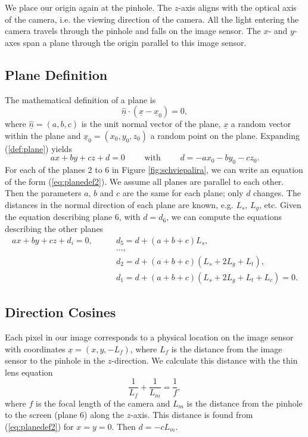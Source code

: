 \documentclass{svjour3}                     %
\begin{document}
We place our origin again at the pinhole. The $z$-axis aligns with the optical axis of the camera, i.e. the viewing direction of the camera. All the light entering the camera travels through the pinhole and falls on the image sensor. The $x$- and $y$-axes span a plane through the origin parallel to this image sensor. 

\subsection{Plane Definition}
The mathematical definition of a plane is
\begin{equation}
	\label{def:plane}
	\underline{\hat{n}} \cdot (\underline{x}-\underline{x}_0) = 0,
\end{equation}
where $\underline{\hat{n}} = (a,b,c)$ is the unit normal vector of the plane, $\underline{x}$ a random vector within the plane and $\underline{x}_0=(x_0, y_0, z_0)$ a random point on the plane. Expanding (\ref{def:plane}) yields
\begin{equation}
	\label{eq:planedef2}
	ax+by+cz + d = 0 \qquad \mbox{ with } \qquad d = - a x_0 - b y_0 - c z_0.
\end{equation}
For each of the planes 2 to 6 in Figure \ref{fig:schviepalira}, we can write an equation of the form (\ref{eq:planedef2}). We assume all planes are parallel to each other. Then the parameters $a$, $b$ and $c$ are the same for each plane; only $d$ changes. The distances in the normal direction of each plane are known, e.g. $L_s$, $L_g$, etc. Given the equation describing plane 6, with $d=d_6$,
we can compute the equations describing the other planes
\begin{align}
a x + b y + c z + d_i = 0, \qquad  
& d_5 = d + (a+b+c) L_s, \nonumber \\
& ..., \nonumber \\ 
& d_2 = d + (a+b+c) (L_s+2L_g+L_t), \nonumber \\
\label{eq:planedef1}
& d_1 = d + (a+b+c) (L_s+2L_g+L_t+L_c) = 0.
\end{align}

\subsection{Direction Cosines}
Each pixel in our image corresponds to a physical location on the image sensor with coordinates $\underline{x} = (x,y, -L_f)$, where $L_f$ is the distance from the image sensor to the pinhole in the $z$-direction. We calculate this distance with the thin lens equation
\begin{equation}
 \frac{1}{L_f} + \frac{1}{L_m} = \frac{1}{f},
\end{equation}
where $f$ is the focal length of the camera and $L_m$ is the distance from the pinhole to the screen (plane 6) along the $z$-axis. This distance is found from (\ref{eq:planedef2}) for $x=y=0$. Then $d = - c L_m$.
\end{document}

